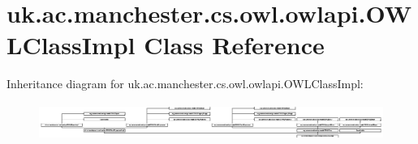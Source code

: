 \hypertarget{classuk_1_1ac_1_1manchester_1_1cs_1_1owl_1_1owlapi_1_1_o_w_l_class_impl}{\section{uk.\-ac.\-manchester.\-cs.\-owl.\-owlapi.\-O\-W\-L\-Class\-Impl Class Reference}
\label{classuk_1_1ac_1_1manchester_1_1cs_1_1owl_1_1owlapi_1_1_o_w_l_class_impl}
}
Inheritance diagram for uk.\-ac.\-manchester.\-cs.\-owl.\-owlapi.\-O\-W\-L\-Class\-Impl\-:\begin{figure}[H]
\begin{center}
\leavevmode
\includegraphics[height=1.210375cm]{classuk_1_1ac_1_1manchester_1_1cs_1_1owl_1_1owlapi_1_1_o_w_l_class_impl}
\end{center}
\end{figure}

